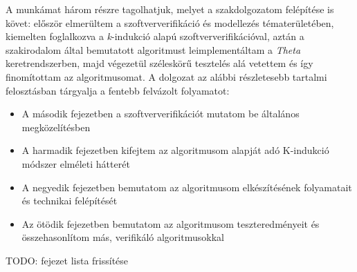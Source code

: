 \newline
\newline
A munkámat három részre tagolhatjuk, melyet a szakdolgozatom felépítése is követ: először elmerültem a szoftververifikáció és modellezés tématerületében, kiemelten foglalkozva a \emph{k}-indukció alapú szoftververifikációval, aztán a szakirodalom által bemutatott algoritmust leimplementáltam a \emph{Theta} keretrendszerben, majd végezetül széleskörű tesztelés alá vetettem és így finomítottam az algoritmusomat.
\newline
\newline
A dolgozat az alábbi részletesebb tartalmi felosztásban tárgyalja a fentebb felvázolt folyamatot:
\begin{itemize}
	\item A második fejezetben a szoftververifikációt mutatom be általános megközelítésben
	\item A harmadik fejezetben kifejtem az algoritmusom alapját adó K-indukció módszer elméleti hátterét
	\item A negyedik fejezetben bemutatom az algoritmusom elkészítésének folyamatait és technikai felépítését
	\item Az ötödik fejezetben bemutatom az algoritmusom teszteredményeit és összehasonlítom más, verifikáló algoritmusokkal
\end{itemize}
TODO: fejezet lista frissítése